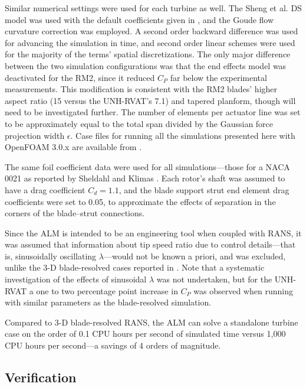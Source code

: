 \documentclass[times]{weauth}
\begin{document}
Similar numerical settings were used for each turbine as well. The Sheng et al.
DS model was used with the default coefficients given in \cite{Sheng2008}, and
the Goude flow curvature correction was employed. A second order backward
difference was used for advancing the simulation in time, and second order
linear schemes were used for the majority of the terms' spatial discretizations.
The only major difference between the two simulation configurations was that the
end effects model was deactivated for the RM2, since it reduced $C_P$ far below
the experimental measurements. This modification is consistent with the RM2
blades' higher aspect ratio (15 versus the UNH-RVAT's 7.1) and tapered planform,
though will need to be investigated further. The number of elements per actuator
line was set to be approximately equal to the total span divided by the Gaussian
force projection width $\epsilon$. Case files for running all the simulations
presented here with OpenFOAM 3.0.x are available from
\cite{Bachant2016-UNH-RVAT-turbinesFoam-v1.0.0,
Bachant2016-RM2-turbinesFoam-v1.0.0,
Bachant2016-UNH-RVAT-turbinesFoam-v1.0.0-LES}.

The same foil coefficient data were used for all simulations---those for a NACA
0021 as reported by Sheldahl and Klimas \cite{Sheldahl1981}. Each rotor's shaft
was assumed to have a drag coefficient $C_d = 1.1$, and the blade support strut
end element drag coefficients were set to 0.05, to approximate the effects of
separation in the corners of the blade--strut connections.

Since the ALM is intended to be an engineering tool when coupled with RANS, it
was assumed that information about tip speed ratio due to control details---that
is, sinusoidally oscillating $\lambda$---would not be known a priori, and was
excluded, unlike the 3-D blade-resolved cases reported in
\cite{Bachant2016-BR-CFD}. Note that a systematic investigation of the effects
of sinusoidal $\lambda$ was not undertaken, but for the UNH-RVAT a one to two
percentage point increase in $C_P$ was observed when running with similar
parameters as the blade-resolved simulation.

Compared to 3-D blade-resolved RANS, the ALM can solve a standalone turbine case
on the order of 0.1 CPU hours per second of simulated time versus 1,000 CPU
hours per second---a savings of 4 orders of magnitude.


\subsection{Verification}
\end{document}
